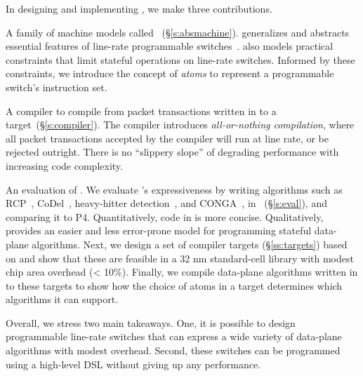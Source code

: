 In designing and implementing \pktlanguage, we make three contributions.
\begin{CompactEnumerate}
  \item A family of machine models called \absmachine~(\S\ref{s:absmachine}).
    \absmachine generalizes and abstracts essential features of
line-rate programmable switches~\cite{rmt, xpliant, flexpipe}. \absmachine also
models practical constraints that limit stateful operations on line-rate
switches.  Informed by these constraints, we introduce the concept of {\em
atoms} to represent a programmable switch's instruction set.
 \item A compiler to compile from packet transactions written in \pktlanguage
to a \absmachine target~(\S\ref{s:compiler}). The \pktlanguage compiler introduces
\textit{all-or-nothing compilation}, where all packet transactions accepted by
the compiler will run at line rate, or be rejected outright. There is no
``slippery slope'' of degrading performance with increasing code complexity.
 \item An evaluation of \pktlanguage. We evaluate \pktlanguage's expressiveness
by writing algorithms such as RCP~\cite{rcp}, CoDel~\cite{codel}, heavy-hitter
detection~\cite{opensketch}, and CONGA~\cite{conga}, in
\pktlanguage~(\S\ref{s:eval}), and comparing it to P4.  Quantitatively, code in
\pktlanguage is more concise. Qualitatively,
\pktlanguage provides an easier and less error-prone model for programming
stateful data-plane algorithms.  Next, we design a set of compiler targets
(\S\ref{ss:targets}) based on \absmachine and show that these are feasible in a
32 nm standard-cell library with modest chip area overhead (< 10\%). Finally,
we compile data-plane algorithms written in \pktlanguage to these targets to
show how the choice of atoms in a target determines which algorithms it can
support.
\end{CompactEnumerate}

Overall, we stress two main takeaways. One, it is possible to design
programmable line-rate switches that can express a wide variety of data-plane
algorithms with modest overhead. Second, these switches can be programmed using
a high-level DSL without giving up any performance.
